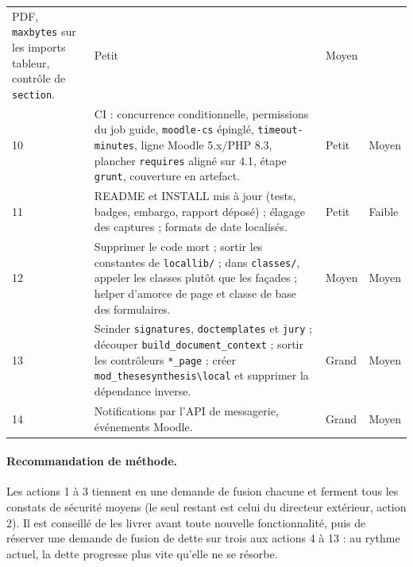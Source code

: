 \documentclass[11pt,a4paper]{article}
\newcommand{\fichier}[1]{\texttt{\small #1}}
\newcommand{\code}[1]{\texttt{#1}}
\begin{document}
\begin{longtable}{@{}p{0.6cm}p{11.2cm}p{1.6cm}p{1.6cm}@{}}
    PDF, \code{maxbytes} sur les imports tableur, contrôle de \code{section}. & Petit & Moyen \\
10 & CI : concurrence conditionnelle, permissions du job guide, \code{moodle-cs} épinglé,
    \code{timeout-minutes}, ligne Moodle 5.x/PHP 8.3, plancher \code{requires} aligné sur 4.1,
    étape \code{grunt}, couverture en artefact. & Petit & Moyen \\
11 & README et INSTALL mis à jour (tests, badges, embargo, rapport déposé) ; élagage des
    captures ; formats de date localisés. & Petit & Faible \\
12 & Supprimer le code mort ; sortir les constantes de \fichier{locallib/} ; dans
    \fichier{classes/}, appeler les classes plutôt que les façades ; helper d'amorce de page et
    classe de base des formulaires. & Moyen & Moyen \\
13 & Scinder \code{signatures}, \code{doctemplates} et \code{jury} ; découper
    \code{build\_document\_context} ; sortir les contrôleurs \code{*\_page} ; créer
    \code{mod\_thesesynthesis\textbackslash local} et supprimer la dépendance inverse. & Grand &
    Moyen \\
14 & Notifications par l'API de messagerie, événements Moodle. & Grand & Moyen \\
\bottomrule
\end{longtable}

\paragraph{Recommandation de méthode.}
Les actions 1 à 3 tiennent en une demande de fusion chacune et ferment tous les constats de
sécurité moyens (le seul restant est celui du directeur extérieur, action 2). Il est conseillé de les livrer avant toute nouvelle fonctionnalité, puis de
réserver une demande de fusion de dette sur trois aux actions 4 à 13 : au rythme actuel, la
dette progresse plus vite qu'elle ne se résorbe.
\end{document}
